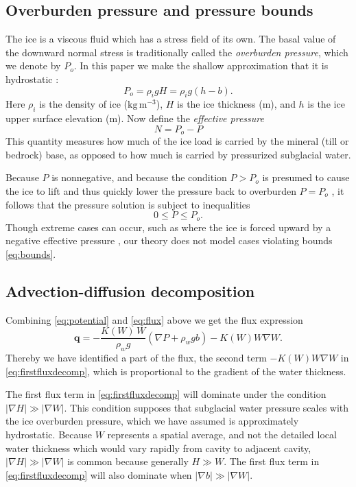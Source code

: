 \documentclass[11pt,final]{amsart}%
\newcommand\bq{\mathbf{q}}
\newcommand{\grad}{\nabla}
\begin{document}
\subsection*{Overburden pressure and pressure bounds}  The ice is a viscous fluid which has a stress field of its own.  The basal value of the downward normal stress is traditionally called the \emph{overburden pressure}, which we denote by $P_o$.  In this paper we make the shallow approximation that it is hydrostatic \citep{GreveBlatter2009}:
\begin{equation} \label{eq:hydrostatic}
  P_o = \rho_i g H = \rho_i g (h-b).
\end{equation}
Here $\rho_i$ is the density of ice ($\text{kg}\,\text{m}^{-3}$), $H$ is the ice thickness (m), and $h$ is the ice upper surface elevation (m).  Now define the \emph{effective pressure}
\begin{equation}
N = P_o - P\label{eq:effective}
\end{equation}
This quantity measures how much of the ice load is carried by the mineral (till or bedrock) base, as opposed to how much is carried by pressurized subglacial water.

Because $P$ is nonnegative, and because the condition $P>P_o$ is presumed to cause the ice to lift and thus quickly lower the pressure back to overburden $P=P_o$ \citep{Schoofetal2012}, it follows that the pressure solution is subject to inequalities
\begin{equation}
0 \le P \le P_o. \label{eq:bounds}
\end{equation}
Though extreme cases can occur, such as where the ice is forced upward by a negative effective pressure \citep{Schoofetal2012}, our theory does not model cases violating bounds \eqref{eq:bounds}.

\subsection*{Advection-diffusion decomposition}  Combining \eqref{eq:potential} and \eqref{eq:flux} above we get the flux expression
\begin{equation}
  \bq = - \frac{K(W)\, W}{\rho_w g} \left(\grad P + \rho_w g b\right) - K(W) W \grad W. \label{eq:firstfluxdecomp}
\end{equation}
Thereby we have identified a part of the flux, the second term $-K(W) W \grad W$ in \eqref{eq:firstfluxdecomp}, which is proportional to the gradient of the water thickness.

The first flux term in \eqref{eq:firstfluxdecomp} will dominate under the condition $|\grad H| \gg |\grad W|$.  This condition supposes that subglacial water pressure scales with the ice overburden pressure, which we have assumed is approximately hydrostatic.  Because $W$ represents a spatial average, and not the detailed local water thickness which would vary rapidly from cavity to adjacent cavity, $|\grad H| \gg |\grad W|$ is common because generally $H\gg W$.  The first flux term in \eqref{eq:firstfluxdecomp} will also dominate when $|\grad b| \gg |\grad W|$. 
\end{document}
